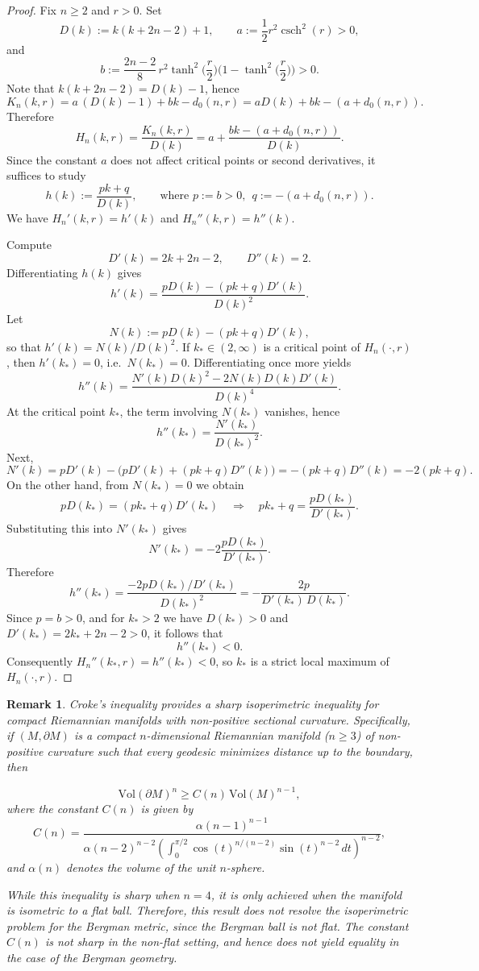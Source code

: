 \documentclass[11pt]{amsart}
\newcommand{\csch}{\operatorname{csch}}
\newtheorem{remark}[theorem]{Remark}
\numberwithin{equation}{section}
\def\ge{\geqslant}
\begin{document}
\begin{proof}
Fix $n\ge2$ and $r>0$.  Set
\[
D(k):=k(k+2n-2)+1,
\qquad
a:=\frac12 r^2\csch^2(r)>0,
\]
and
\[
b:=\frac{2n-2}{8}\,r^2\tanh^2\!\Big(\frac r2\Big)\Big(1-\tanh^2\!\Big(\frac r2\Big)\Big)>0.
\]
Note that $k(k+2n-2)=D(k)-1$, hence
\[
K_n(k,r)=a\,(D(k)-1)+bk-d_0(n,r)
= aD(k)+bk-(a+d_0(n,r)).
\]
Therefore
\[
H_n(k,r)=\frac{K_n(k,r)}{D(k)}
= a+\frac{bk-(a+d_0(n,r))}{D(k)}.
\]
Since the constant $a$ does not affect critical points or second derivatives, it suffices to study
\[
h(k):=\frac{pk+q}{D(k)},
\qquad\text{where } p:=b>0,\ \ q:=-(a+d_0(n,r)).
\]
We have $H_n'(k,r)=h'(k)$ and $H_n''(k,r)=h''(k)$.

Compute
\[
D'(k)=2k+2n-2,\qquad D''(k)=2.
\]
Differentiating $h(k)$ gives
\[
h'(k)=\frac{pD(k)-(pk+q)D'(k)}{D(k)^2}.
\]
Let
\[
N(k):=pD(k)-(pk+q)D'(k),
\]
so that $h'(k)=N(k)/D(k)^2$.  If $k_\ast\in(2,\infty)$ is a critical point of $H_n(\cdot,r)$, then
$h'(k_\ast)=0$, i.e.\ $N(k_\ast)=0$.  Differentiating once more yields
\[
h''(k)=\frac{N'(k)D(k)^2-2N(k)D(k)D'(k)}{D(k)^4}.
\]
At the critical point $k_\ast$, the term involving $N(k_\ast)$ vanishes, hence
\[
h''(k_\ast)=\frac{N'(k_\ast)}{D(k_\ast)^2}.
\]
Next,
\[
N'(k)=pD'(k)-\Big(pD'(k)+(pk+q)D''(k)\Big)=-(pk+q)D''(k)=-2(pk+q).
\]
On the other hand, from $N(k_\ast)=0$ we obtain
\[
pD(k_\ast)=(pk_\ast+q)D'(k_\ast)
\quad\Longrightarrow\quad
pk_\ast+q=\frac{pD(k_\ast)}{D'(k_\ast)}.
\]
Substituting this into $N'(k_\ast)$ gives
\[
N'(k_\ast)=-2\frac{pD(k_\ast)}{D'(k_\ast)}.
\]
Therefore
\[
h''(k_\ast)
=
\frac{-2pD(k_\ast)/D'(k_\ast)}{D(k_\ast)^2}
=
-\frac{2p}{D'(k_\ast)\,D(k_\ast)}.
\]
Since $p=b>0$, and for $k_\ast>2$ we have $D(k_\ast)>0$ and $D'(k_\ast)=2k_\ast+2n-2>0$,
it follows that
\[
h''(k_\ast)<0.
\]
Consequently $H_n''(k_\ast,r)=h''(k_\ast)<0$, so $k_\ast$ is a strict local maximum of $H_n(\cdot,r)$.
\end{proof}



\begin{remark}

Croke's inequality \cite{Croke1984} provides a sharp isoperimetric inequality for compact Riemannian manifolds with non-positive sectional curvature. Specifically, if $(M, \partial M)$ is a compact $n$-dimensional Riemannian manifold ($n \geq 3$) of non-positive curvature such that every geodesic minimizes distance up to the boundary, then

\[
\mathrm{Vol}(\partial M)^n \geq C(n) \, \mathrm{Vol}(M)^{n-1},
\]
where the constant $C(n)$ is given by
\[
C(n) = \frac{\alpha(n-1)^{n-1}}{\alpha(n-2)^{n-2} \left( \int_0^{\pi/2} \cos(t)^{n/(n-2)} \sin(t)^{n-2} \, dt \right)^{n-2}},
\]
and $\alpha(n)$ denotes the volume of the unit $n$-sphere.

While this inequality is sharp when $n = 4$, it is only achieved when the manifold is isometric to a flat ball. Therefore, this result does \emph{not} resolve the isoperimetric problem for the Bergman metric, since the Bergman ball is not flat. The constant $C(n)$ is not sharp in the non-flat setting, and hence does not yield equality in the case of the Bergman geometry.
\end{remark}
\end{document}

